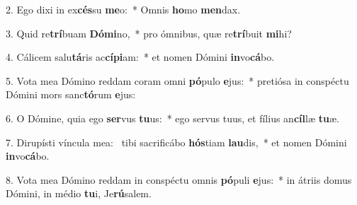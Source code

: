 2. Ego dixi in ex\textbf{cés}su \textbf{me}o:~*  Omnis \textbf{ho}mo \textbf{men}dax.\

3. Quid re\textbf{trí}buam \textbf{Dó}\textbf{mi}no,~*  pro ómnibus, quæ re\textbf{trí}buit \textbf{mi}hi?\

4. Cálicem salu\textbf{tá}ris ac\textbf{cí}\textbf{pi}am:~*  et nomen Dómini \textbf{in}vo\textbf{cá}bo.\

5. Vota mea Dómino reddam coram omni \textbf{pó}pulo \textbf{e}jus:~*  pretiósa in conspéctu Dómini mors sanc\textbf{tó}rum \textbf{e}jus:\

6. O Dómine, quia ego \textbf{ser}vus \textbf{tu}us:~*  ego servus tuus, et fílius an\textbf{cíl}læ \textbf{tu}æ.\

7. Dirupísti víncula mea: \dag\  tibi sacrificábo \textbf{hós}tiam \textbf{lau}dis,~*  et nomen Dómini \textbf{in}vo\textbf{cá}bo.\

8. Vota mea Dómino reddam in conspéctu omnis \textbf{pó}puli \textbf{e}jus:~*  in átriis domus Dómini, in médio \textbf{tu}i, Je\textbf{rú}salem.\


